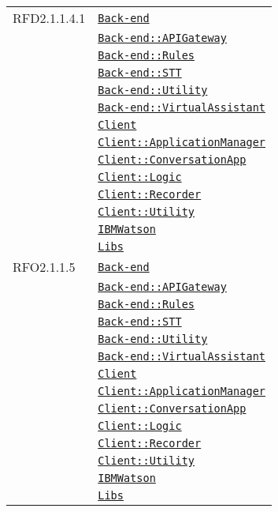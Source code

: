 \begin{longtable}{|>{\centering}m{3cm}|m{10cm}<{\centering}|}
RFD2.1.1.4.1 & \hyperref[Back-end]{\texttt{Back-end}}\\
& \hyperref[Back-end::APIGateway]{\texttt{Back-end::APIGateway}}\\
& \hyperref[Back-end::Rules]{\texttt{Back-end::Rules}}\\
& \hyperref[Back-end::STT]{\texttt{Back-end::STT}}\\
& \hyperref[Back-end::Utility]{\texttt{Back-end::Utility}}\\
& \hyperref[Back-end::VirtualAssistant]{\texttt{Back-end::VirtualAssistant}}\\
& \hyperref[Client]{\texttt{Client}}\\
& \hyperref[Client::ApplicationManager]{\texttt{Client::ApplicationManager}}\\
& \hyperref[Client::ConversationApp]{\texttt{Client::ConversationApp}}\\
& \hyperref[Client::Logic]{\texttt{Client::Logic}}\\
& \hyperref[Client::Recorder]{\texttt{Client::Recorder}}\\
& \hyperref[Client::Utility]{\texttt{Client::Utility}}\\
& \hyperref[IBMWatson]{\texttt{IBMWatson}}\\
& \hyperref[Libs]{\texttt{Libs}}\\ \hline

RFO2.1.1.5 & \hyperref[Back-end]{\texttt{Back-end}}\\
& \hyperref[Back-end::APIGateway]{\texttt{Back-end::APIGateway}}\\
& \hyperref[Back-end::Rules]{\texttt{Back-end::Rules}}\\
& \hyperref[Back-end::STT]{\texttt{Back-end::STT}}\\
& \hyperref[Back-end::Utility]{\texttt{Back-end::Utility}}\\
& \hyperref[Back-end::VirtualAssistant]{\texttt{Back-end::VirtualAssistant}}\\
& \hyperref[Client]{\texttt{Client}}\\
& \hyperref[Client::ApplicationManager]{\texttt{Client::ApplicationManager}}\\
& \hyperref[Client::ConversationApp]{\texttt{Client::ConversationApp}}\\
& \hyperref[Client::Logic]{\texttt{Client::Logic}}\\
& \hyperref[Client::Recorder]{\texttt{Client::Recorder}}\\
& \hyperref[Client::Utility]{\texttt{Client::Utility}}\\
& \hyperref[IBMWatson]{\texttt{IBMWatson}}\\
& \hyperref[Libs]{\texttt{Libs}}\\ \hline


\end{longtable}
